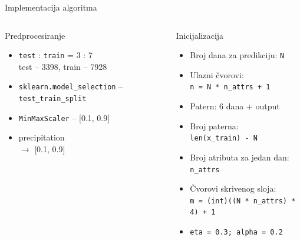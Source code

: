 \documentclass{beamer}
\begin{document}
\begin{frame}{Implementacija algoritma}
    \small{
    \begin{columns}
    \begin{block}{Predprocesiranje}
        \begin{itemize}
            \item \texttt{test} : \texttt{train} = 3 : 7 \\ test -- 3398, train -- 7928
            \item \texttt{sklearn.model\_selection} -- \texttt{test\_train\_split}
            \item \texttt{MinMaxScaler} -- [0.1, 0.9]
            \item precipitation \\[0, 100] $\rightarrow$  [0.1, 0.9]
        \end{itemize}
    \end{block}
    \begin{block}{Inicijalizacija}
        \begin{itemize}
            \item Broj dana za predikciju: \texttt{N}
            \item Ulazni čvorovi:\\\texttt{n = N * n\_attrs + 1}
            \item Patern: 6 dana + output
            \item Broj paterna:\\\texttt{len(x\_train) - N}
            \item Broj atributa za jedan dan: \texttt{n\_attrs}
            \item Čvorovi skrivenog sloja:\\ \texttt{m = (int)((N * n\_attrs) * 4) + 1}
            \item \texttt{eta = 0.3; alpha = 0.2}
        \end{itemize}
    \end{block}
    \end{columns}
    }
\end{frame}
\end{document}
